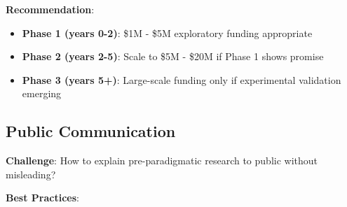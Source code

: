 \textbf{Recommendation}:
\begin{itemize}
    \item \textbf{Phase 1 (years 0-2)}: \$1M - \$5M exploratory funding appropriate
    \item \textbf{Phase 2 (years 2-5)}: Scale to \$5M - \$20M if Phase 1 shows promise
    \item \textbf{Phase 3 (years 5+)}: Large-scale funding only if experimental validation emerging
\end{itemize}

\subsection{Public Communication}

\textbf{Challenge}: How to explain pre-paradigmatic research to public without misleading?

\textbf{Best Practices}:

